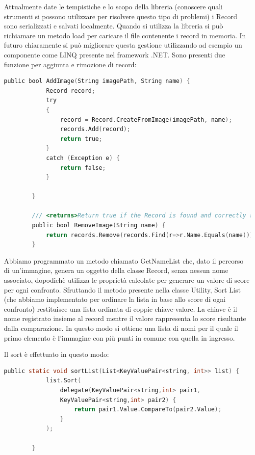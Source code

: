 \documentclass[twoside]{supsistudent}
\begin{document}
Attualmente date le tempistiche e lo scopo della libreria (conoscere quali strumenti si possono utilizzare per risolvere questo tipo di problemi) i Record sono serializzati e salvati localmente. Quando si utilizza la libreria si può richiamare un metodo load per caricare il file contenente i record in memoria. In futuro chiaramente si può migliorare questa gestione utilizzando ad esempio un componente come LINQ presente nel framework .NET.
Sono presenti due funzione per aggiunta e rimozione di record:


\begin{lstlisting}[language=C]
public bool AddImage(String imagePath, String name) {
            Record record;
            try
            {
                record = Record.CreateFromImage(imagePath, name);
                records.Add(record);
                return true;
            }
            catch (Exception e) {
                return false;
            }
            
        }
        
        /// <returns>Return true if the Record is found and correctly removed from the repository, else false</returns>
        public bool RemoveImage(String name) {
            return records.Remove(records.Find(r=>r.Name.Equals(name)));
        }
\end{lstlisting}

Abbiamo programmato un metodo chiamato GetNameList che, dato il percorso di un'immagine, genera un oggetto della classe Record, senza nessun nome associato, dopodichè utilizza le proprietà calcolate per generare un valore di score per ogni confronto. Sfruttando il metodo presente nella classe Utility, Sort List (che abbiamo implementato per ordinare la lista in base allo score di ogni confronto) restituisce una lista ordinata di coppie chiave-valore. La chiave è il nome registrato insieme al record mentre il valore rappresenta lo score risultante dalla comparazione. In questo modo si ottiene una lista di nomi per il quale il primo elemento è l'immagine con più punti in comune con quella in ingresso. 

Il sort è effettuato in questo modo:

\begin{lstlisting}[language=C]
  public static void sortList(List<KeyValuePair<string, int>> list) {
            list.Sort(
                delegate(KeyValuePair<string,int> pair1,
                KeyValuePair<string,int> pair2) {
                    return pair1.Value.CompareTo(pair2.Value);
                }
            );
          
        }
\end{lstlisting}
\end{document}
